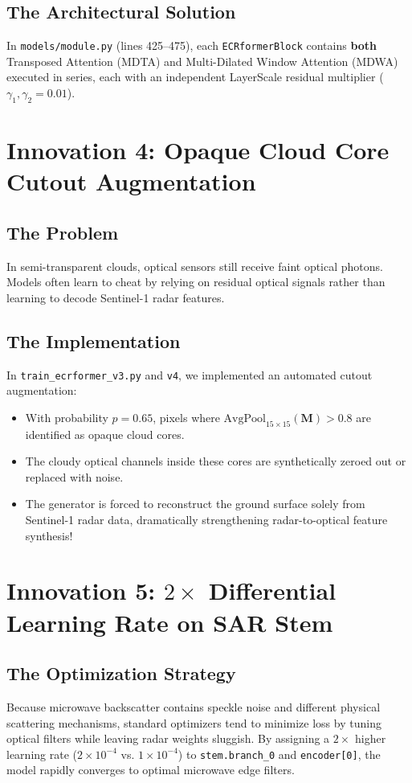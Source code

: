 \subsection{The Architectural Solution}
In \texttt{models/module.py} (lines 425--475), each \texttt{ECRformerBlock} contains \textbf{both} Transposed Attention (MDTA) and Multi-Dilated Window Attention (MDWA) executed in series, each with an independent LayerScale residual multiplier ($\gamma_1, \gamma_2 = 0.01$).

\section{Innovation 4: Opaque Cloud Core Cutout Augmentation}
\subsection{The Problem}
In semi-transparent clouds, optical sensors still receive faint optical photons. Models often learn to cheat by relying on residual optical signals rather than learning to decode Sentinel-1 radar features.

\subsection{The Implementation}
In \texttt{train\_ecrformer\_v3.py} and \texttt{v4}, we implemented an automated cutout augmentation:
\begin{itemize}
    \item With probability $p=0.65$, pixels where $\text{AvgPool}_{15\times 15}(\mathbf{M}) > 0.8$ are identified as opaque cloud cores.
    \item The cloudy optical channels inside these cores are synthetically zeroed out or replaced with noise.
    \item The generator is forced to reconstruct the ground surface solely from Sentinel-1 radar data, dramatically strengthening radar-to-optical feature synthesis!
\end{itemize}

\section{Innovation 5: $2\times$ Differential Learning Rate on SAR Stem}
\subsection{The Optimization Strategy}
Because microwave backscatter contains speckle noise and different physical scattering mechanisms, standard optimizers tend to minimize loss by tuning optical filters while leaving radar weights sluggish. By assigning a $2\times$ higher learning rate ($2 \times 10^{-4}$ vs. $1 \times 10^{-4}$) to \texttt{stem.branch\_0} and \texttt{encoder[0]}, the model rapidly converges to optimal microwave edge filters.

